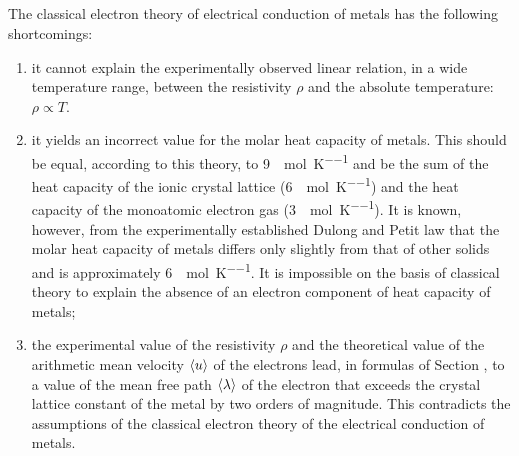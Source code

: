 \subsection{}\label{20.3.7} The classical electron theory of electrical conduction of metals has the following shortcomings:
\begin{enumerate}[label=(\alph*)]
\item it cannot explain the experimentally observed linear relation, in a wide temperature range, between the resistivity $\rho$ and the absolute temperature: $\rho \propto T$.

\item it yields an incorrect value for the molar heat capacity of metals. This should be equal, according to this theory, to \SI{9}{\calorie\per\mole\per\kelvin} and be the sum of the heat capacity of the ionic crystal lattice (\SI{6}{\calorie\per\mole\per\kelvin}) and the heat capacity of the mon­oatomic electron gas (\SI{3}{\calorie\per\mole\per\kelvin}). It is known, however, from the experimentally established Dulong and Petit law  that the molar heat capacity of metals differs only slightly from that of other solids and is approximately \SI{6}{\calorie\per\mole\per\kelvin}. It is impossible on the basis of classical theory to explain the absence of an electron component of heat capacity of metals;
\item the experimental value of the resistivity $\rho$ and the theoretical value of the arithmetic mean velocity $\expval{u}$ of the electrons lead, in formulas of Section , to a value of the mean free path $\expval{\lambda}$ of the electron that exceeds the crystal lattice constant of the metal by two orders of magnitude. This contradicts the assumptions of the classical electron theory of the electrical conduction of metals.
\end{enumerate}